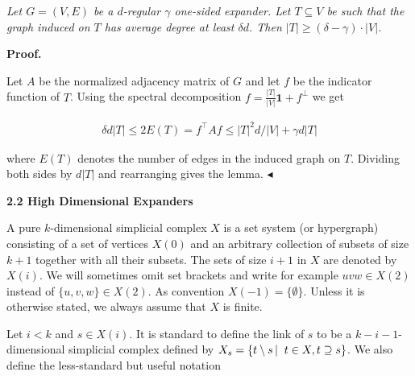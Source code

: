 \documentclass[10pt,a4paper]{article}
\begin{document}
\emph{Let $G=(V,E)$ be a $d$-regular $\gamma$ one-sided expander. Let $T\subseteq V$ be such that the graph induced on $T$ has average degree at least $\delta d$. Then $|T|\geq(\delta-\gamma)\cdot|V|$.}\par






\par\medskip\noindent\textbf{Proof.}\par




Let $A$ be the normalized adjacency matrix of $G$ and let $f$ be the indicator function of $T$. Using the spectral decomposition $f=\frac{|T|}{|V|}{\mathbf{1}}+f^{\perp}$ we get\par


\[\begin{gathered}
\delta d|T|\leq 2E(T)=f^{\top}Af\leq\lvert T\rvert^{2}d/|V|+\gamma d\lvert T\rvert
\end{gathered}\]


where $E(T)$ denotes the number of edges in the induced graph on $T$.
Dividing both sides by $d|T|$ and rearranging gives the lemma.
$\blacktriangleleft$\par






\par\medskip\noindent\textbf{
2.2 High Dimensional Expanders}\par




A pure $k$-dimensional simplicial complex $X$ is a set system (or hypergraph) consisting of a set of vertices $X(0)$ and an arbitrary collection of subsets of size $k+1$ together with all their subsets. The sets of size $i+1$ in $X$ are denoted by $X(i)$. We will sometimes omit set brackets and write for example $uvw\in X(2)$ instead of $\{u,v,w\}\in X(2)$. As convention $X(-1)=\{\emptyset\}$. Unless it is otherwise stated, we always assume that $X$ is finite.\par




Let $i<k$ and $s\in X(i)$. It is standard to define the link of $s$ to be a $k-i-1$-dimensional simplicial complex defined by
$X_{s}=\left\{t\setminus s\left|\;\vphantom{t\setminus st\in X,t\supseteq s}\right.t\in X,t\supseteq s\right\}$. We also define the less-standard but useful notation\par
\end{document}
